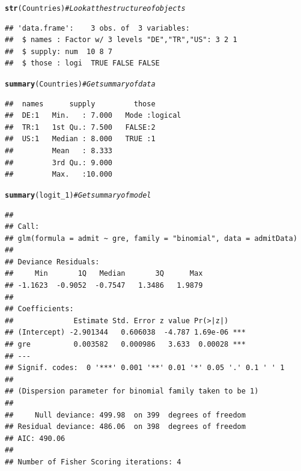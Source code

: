 \documentclass{beamer}\usepackage[]{graphicx}\usepackage[]{color}
\makeatletter
\newcommand{\hlcom}[1]{\textcolor[rgb]{0.678,0.584,0.686}{\textit{#1}}}%
\newcommand{\hlstd}[1]{\textcolor[rgb]{0.345,0.345,0.345}{#1}}%
\newcommand{\hlkwd}[1]{\textcolor[rgb]{0.737,0.353,0.396}{\textbf{#1}}}%
\newenvironment{kframe}{%
 \def\at@end@of@kframe{}%
 \ifinner\ifhmode%
  \def\at@end@of@kframe{\end{minipage}}%
  \begin{minipage}{\columnwidth}%
 \fi\fi%
 \def\FrameCommand##1{\hskip\@totalleftmargin \hskip-\fboxsep
 \colorbox{shadecolor}{##1}\hskip-\fboxsep
     \hskip-\linewidth \hskip-\@totalleftmargin \hskip\columnwidth}%
 \MakeFramed {\advance\hsize-\width
   \@totalleftmargin\z@ \linewidth\hsize
   \@setminipage}}%
 {\par\unskip\endMakeFramed%
 \at@end@of@kframe}
\newenvironment{knitrout}{}{} %
\makeatother
\begin{document}
\begin{frame}
\begin{knitrout}\scriptsize
{}\color{fgcolor}\begin{kframe}
\begin{alltt}
\hlkwd{str}\hlstd{(Countries)}  \hlcom{# Look at the structure of objects}
\end{alltt}
\begin{verbatim}
## 'data.frame':	3 obs. of  3 variables:
##  $ names : Factor w/ 3 levels "DE","TR","US": 3 2 1
##  $ supply: num  10 8 7
##  $ those : logi  TRUE FALSE FALSE
\end{verbatim}
\begin{alltt}
\hlkwd{summary}\hlstd{(Countries)}  \hlcom{# Get summary of data}
\end{alltt}
\begin{verbatim}
##  names      supply         those        
##  DE:1   Min.   : 7.000   Mode :logical  
##  TR:1   1st Qu.: 7.500   FALSE:2        
##  US:1   Median : 8.000   TRUE :1        
##         Mean   : 8.333                  
##         3rd Qu.: 9.000                  
##         Max.   :10.000
\end{verbatim}
\end{kframe}
\end{knitrout}



\begin{knitrout}\tiny
{}\color{fgcolor}\begin{kframe}
\begin{alltt}
\hlkwd{summary}\hlstd{(logit_1)}  \hlcom{# Get summary of model}
\end{alltt}
\begin{verbatim}
## 
## Call:
## glm(formula = admit ~ gre, family = "binomial", data = admitData)
## 
## Deviance Residuals: 
##     Min       1Q   Median       3Q      Max  
## -1.1623  -0.9052  -0.7547   1.3486   1.9879  
## 
## Coefficients:
##              Estimate Std. Error z value Pr(>|z|)    
## (Intercept) -2.901344   0.606038  -4.787 1.69e-06 ***
## gre          0.003582   0.000986   3.633  0.00028 ***
## ---
## Signif. codes:  0 '***' 0.001 '**' 0.01 '*' 0.05 '.' 0.1 ' ' 1
## 
## (Dispersion parameter for binomial family taken to be 1)
## 
##     Null deviance: 499.98  on 399  degrees of freedom
## Residual deviance: 486.06  on 398  degrees of freedom
## AIC: 490.06
## 
## Number of Fisher Scoring iterations: 4
\end{verbatim}
\end{kframe}
\end{knitrout}


\end{frame}
\end{document}
